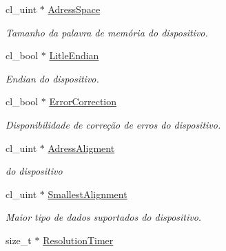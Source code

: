 \begin{DoxyCompactItemize}
\hypertarget{structdevices_a182e89c37d67b506545b1c9e997d6ea0}{}\label{structdevices_a182e89c37d67b506545b1c9e997d6ea0} 
cl\+\_\+uint $\ast$ \hyperlink{structdevices_a182e89c37d67b506545b1c9e997d6ea0}{Adress\+Space}
\begin{DoxyCompactList}\small\item\em Tamanho da palavra de memória do dispositivo. \end{DoxyCompactList}\item 
\hypertarget{structdevices_a8390af633e64c708dc94de7adaa772a4}{}\label{structdevices_a8390af633e64c708dc94de7adaa772a4} 
cl\+\_\+bool $\ast$ \hyperlink{structdevices_a8390af633e64c708dc94de7adaa772a4}{Litle\+Endian}
\begin{DoxyCompactList}\small\item\em Endian do dispositivo. \end{DoxyCompactList}\item 
\hypertarget{structdevices_a5478070b6e9b3d75d1e556299e01e7a9}{}\label{structdevices_a5478070b6e9b3d75d1e556299e01e7a9} 
cl\+\_\+bool $\ast$ \hyperlink{structdevices_a5478070b6e9b3d75d1e556299e01e7a9}{Error\+Correction}
\begin{DoxyCompactList}\small\item\em Disponibilidade de correção de erros do dispositivo. \end{DoxyCompactList}\item 
\hypertarget{structdevices_a8fa9f23457281b6462ab0c295bb7c1ad}{}\label{structdevices_a8fa9f23457281b6462ab0c295bb7c1ad} 
cl\+\_\+uint $\ast$ \hyperlink{structdevices_a8fa9f23457281b6462ab0c295bb7c1ad}{Adress\+Aligment}
\begin{DoxyCompactList}\small\item\em do dispositivo \end{DoxyCompactList}\item 
\hypertarget{structdevices_a060bc9304113f2b9e14cda4a7c2cb38e}{}\label{structdevices_a060bc9304113f2b9e14cda4a7c2cb38e} 
cl\+\_\+uint $\ast$ \hyperlink{structdevices_a060bc9304113f2b9e14cda4a7c2cb38e}{Smallest\+Alignment}
\begin{DoxyCompactList}\small\item\em Maior tipo de dados suportados do dispositivo. \end{DoxyCompactList}\item 
\hypertarget{structdevices_aaa9dd094d6ffb909be80c312216479ed}{}\label{structdevices_aaa9dd094d6ffb909be80c312216479ed} 
size\+\_\+t $\ast$ \hyperlink{structdevices_aaa9dd094d6ffb909be80c312216479ed}{Resolution\+Timer}

\end{DoxyCompactItemize}
